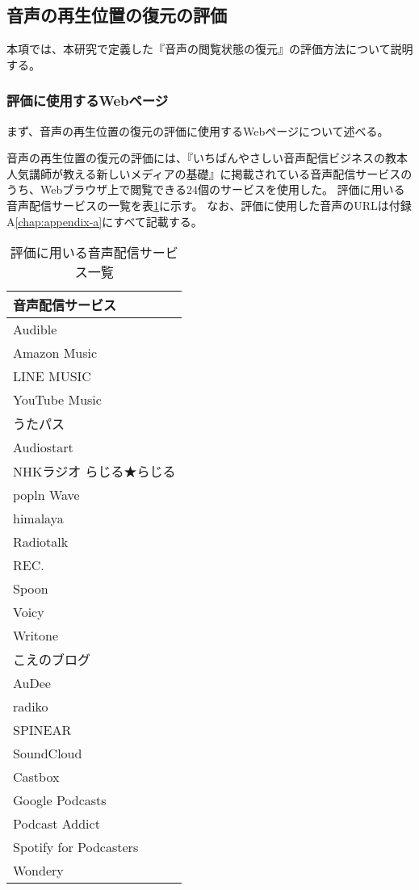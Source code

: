 \subsection{音声の再生位置の復元の評価}
本項では、本研究で定義した『音声の閲覧状態の復元』の評価方法について説明する。

\subsubsection{評価に使用するWebページ}
まず、音声の再生位置の復元の評価に使用するWebページについて述べる。

音声の再生位置の復元の評価には、『いちばんやさしい音声配信ビジネスの教本 人気講師が教える新しいメディアの基礎』\cite{easiest-audio-buisiness-book}に掲載されている音声配信サービスのうち、Webブラウザ上で閲覧できる24個のサービスを使用した。
評価に用いる音声配信サービスの一覧を表\ref{tb:evl-audio-service-list}に示す。
なお、評価に使用した音声のURLは付録A\ref{chap:appendix-a}にすべて記載する。

\begin{table}[htbp]
  \label{tb:evl-audio-service-list}
  \caption{評価に用いる音声配信サービス一覧}
  \begin{center}
    \begin{tabular}{|l|}
    \hline
    音声配信サービス  \\\hline\hline
    Audible \\ \hline
    Amazon Music \\ \hline
    LINE MUSIC \\ \hline
    YouTube Music \\ \hline
    うたパス \\ \hline
    Audiostart \\ \hline
    NHKラジオ らじる★らじる \\ \hline
    popln Wave \\ \hline
    himalaya \\ \hline
    Radiotalk \\ \hline
    REC. \\ \hline
    Spoon \\ \hline
    Voicy \\ \hline
    Writone \\ \hline
    こえのブログ \\ \hline
    AuDee \\ \hline
    radiko \\ \hline
    SPINEAR \\ \hline
    SoundCloud \\ \hline
    Castbox \\ \hline
    Google Podcasts \\ \hline
    Podcast Addict \\ \hline
    Spotify for Podcasters \\ \hline
    Wondery \\ \hline
    \end{tabular}
  \end{center}
\end{table}


